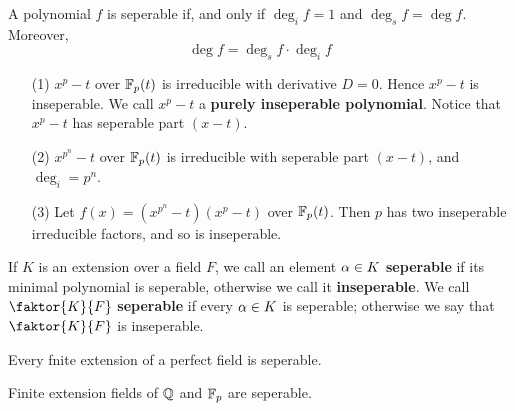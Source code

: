 \begin{lemma}\label{1.6.9}
    A polynomial $f$ is seperable if, and only if  $\deg_i{f}=1$ and
    $\deg_s{f}=\deg{f}$. Moreover,
    \begin{equation*}
        \deg{f}=\deg_s{f} \cdot \deg_i{f}
    \end{equation*}
\end{lemma}

\begin{example}\label{example_1.17}
    \begin{enumerate}
        \item[(1)] $x^p-t$ over  $\mathbb{F}_p(t)$ is irreducible with derivative $D=0$.
            Hence  $x^p-t$ is inseperable. We call  $x^p-t$ a  \textbf{purely
            inseperable polynomial}. Notice that $x^p-t$ has seperable part
            $(x-t)$.

        \item[(2)] $x^{p^n}-t$ over $\mathbb{F}_p(t)$ is irreducible with seperable part
            $(x-t)$, and $\deg_i=p^n$.

        \item [(3)] Let $f(x)=(x^{p^n}-t)(x^p-t)$ over $\mathbb{F}_p(t)$. Then $p$ has
            two inseperable irreducible factors, and so is inseperable.
    \end{enumerate}
\end{example}

\begin{definition}
    If $K$ is an extension over a field $F$, we call an element $\alpha \in K$
    \textbf{seperable} if its minimal polynomial is seperable, otherwise we call
    it \textbf{inseperable}. We call $\faktor{K}{F}$ \textbf{seperable} if every
    $\alpha \in K$ is seperable; otherwise we say that  $\faktor{K}{F}$ is
    inseperable.
\end{definition}

\begin{lemma}\label{1.6.10}
    Every fnite extension of a perfect field is seperable.
\end{lemma}
\begin{corollary}
    Finite extension fields of $\mathbb{Q}$ and  $\mathbb{F}_p$ are seperable.
\end{corollary}
